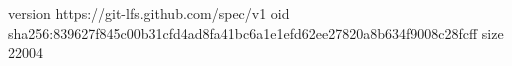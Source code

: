 version https://git-lfs.github.com/spec/v1
oid sha256:839627f845c00b31cfd4ad8fa41bc6a1e1efd62ee27820a8b634f9008c28fcff
size 22004
